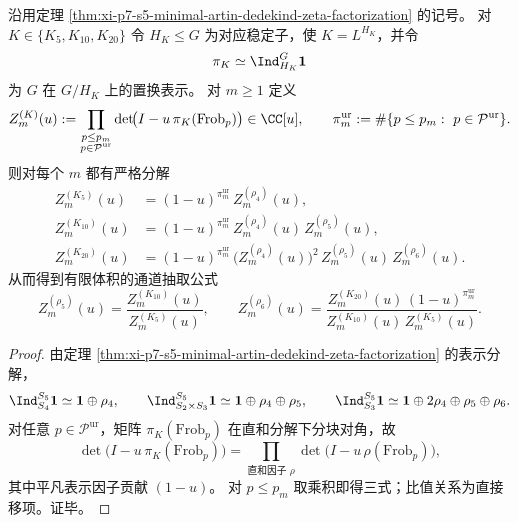 \begin{theorem}\label{thm:xi-p7-leyang-finite-volume-artin-dedekind-factorization}
沿用定理 \ref{thm:xi-p7-s5-minimal-artin-dedekind-zeta-factorization} 的记号。
对 \(K\in\{K_5,K_{10},K_{20}\}\) 令 \(H_K\le G\) 为对应稳定子，使 \(K=L^{H_K}\)，并令
\[
\pi_K\simeq \Ind_{H_K}^{G}\mathbf 1
\]
为 \(G\) 在 \(G/H_K\) 上的置换表示。
对 \(m\ge 1\) 定义
\[
Z_m^{(K)}(u):=\prod_{\substack{p\le p_m\\ p\in \mathcal P^{\mathrm{ur}}}}\det\!\bigl(I-u\,\pi_K(\mathrm{Frob}_p)\bigr)\in\CC[u],
\qquad
\pi_m^{\mathrm{ur}}:=\#\{p\le p_m:\ p\in\mathcal P^{\mathrm{ur}}\}.
\]
则对每个 \(m\) 都有严格分解
\[
\boxed{\begin{aligned}
Z_m^{(K_5)}(u)&=(1-u)^{\pi_m^{\mathrm{ur}}}\, Z_m^{(\rho_4)}(u),\\
Z_m^{(K_{10})}(u)&=(1-u)^{\pi_m^{\mathrm{ur}}}\, Z_m^{(\rho_4)}(u)\, Z_m^{(\rho_5)}(u),\\
Z_m^{(K_{20})}(u)&=(1-u)^{\pi_m^{\mathrm{ur}}}\, \bigl(Z_m^{(\rho_4)}(u)\bigr)^2\, Z_m^{(\rho_5)}(u)\, Z_m^{(\rho_6)}(u).
\end{aligned}}
\]
从而得到有限体积的通道抽取公式
\[
Z_m^{(\rho_5)}(u)=\frac{Z_m^{(K_{10})}(u)}{Z_m^{(K_5)}(u)},
\qquad
Z_m^{(\rho_6)}(u)=\frac{Z_m^{(K_{20})}(u)\,(1-u)^{\pi_m^{\mathrm{ur}}}}{Z_m^{(K_{10})}(u)\,Z_m^{(K_5)}(u)}.
\]
\end{theorem}
\begin{proof}
由定理 \ref{thm:xi-p7-s5-minimal-artin-dedekind-zeta-factorization} 的表示分解，
\[
\Ind_{S_4}^{S_5}\mathbf 1\simeq \mathbf 1\oplus\rho_4,\qquad
\Ind_{S_2\times S_3}^{S_5}\mathbf 1\simeq \mathbf 1\oplus\rho_4\oplus\rho_5,\qquad
\Ind_{S_3}^{S_5}\mathbf 1\simeq \mathbf 1\oplus 2\rho_4\oplus\rho_5\oplus\rho_6.
\]
对任意 \(p\in\mathcal P^{\mathrm{ur}}\)，矩阵 \(\pi_K(\mathrm{Frob}_p)\) 在直和分解下分块对角，故
\[
\det\!\bigl(I-u\,\pi_K(\mathrm{Frob}_p)\bigr)
=\prod_{\text{直和因子 }\rho}\det\!\bigl(I-u\,\rho(\mathrm{Frob}_p)\bigr),
\]
其中平凡表示因子贡献 \((1-u)\)。
对 \(p\le p_m\) 取乘积即得三式；比值关系为直接移项。证毕。
\end{proof}

